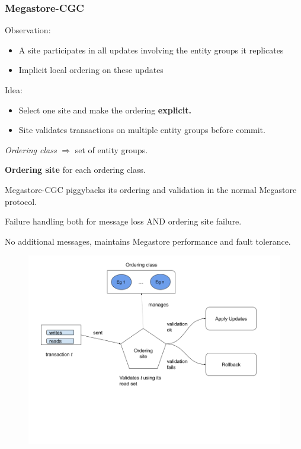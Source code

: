 \documentclass{beamer}
\begin{document}
\begin{frame}
\frametitle{Megastore-CGC}

    Observation:
    \begin{itemize}
        \item A site participates in all updates involving the entity groups it replicates 
        \item Implicit local ordering on these updates
    \end{itemize}  
            
    Idea:
    \begin{itemize}
        \item Select one site and make the ordering \textbf{explicit.}
        \item Site validates transactions on multiple entity groups before commit.
    \end{itemize}

    \emph{Ordering class} $\Rightarrow$ set of entity groups.

    \textbf{Ordering site} for each ordering class.
\end{frame}

\begin{frame}
    Megastore-CGC piggybacks its ordering and validation in the normal Megastore protocol.
    


    \bigskip
    Failure handling both for message loss AND ordering site failure.

    \bigskip
    No additional messages, maintains Megastore performance and fault tolerance. 

    \begin{figure}
        \includegraphics[width=\textwidth,height=\textheight,keepaspectratio]{img/validate.png}
    \end{figure}
\end{frame}
\end{document}

